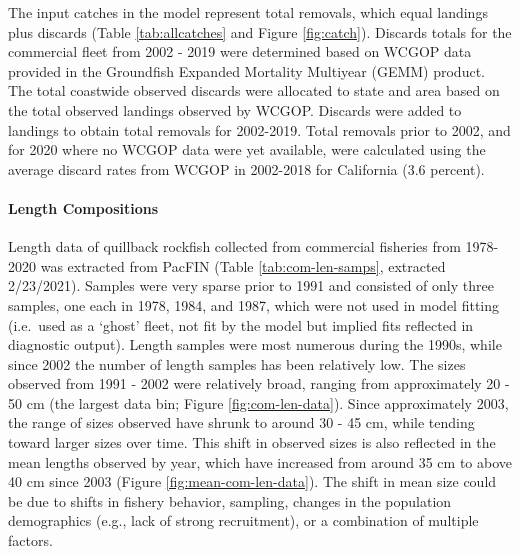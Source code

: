 \documentclass[11pt,
  english,
  a4paper,
]{article}
\begin{document}
\leavevmode\tagmcend\tagstructend\par


The input catches in the model represent total removals, which equal landings plus discards (Table \ref{tab:allcatches} and Figure \ref{fig:catch}). Discards totals for the commercial fleet from 2002 - 2019 were determined based on WCGOP data provided in the Groundfish Expanded Mortality Multiyear (GEMM) product. The total coastwide observed discards were allocated to state and area based on the total observed landings observed by WCGOP. Discards were added to landings to obtain total removals for 2002-2019. Total removals prior to 2002, and for 2020 where no WCGOP data were yet available, were calculated using the average discard rates from WCGOP in 2002-2018 for California (3.6 percent).

\leavevmode\tagmcend\tagstructend\par


\hypertarget{length-compositions}{%
\paragraph{Length Compositions}\label{length-compositions}}

\leavevmode\tagmcend\tagstructend


Length data of quillback rockfish collected from commercial fisheries from 1978-2020 was extracted from PacFIN (Table \ref{tab:com-len-samps}, extracted 2/23/2021). Samples were very sparse prior to 1991 and consisted of only three samples, one each in 1978, 1984, and 1987, which were not used in model fitting (i.e.~used as a `ghost' fleet, not fit by the model but implied fits reflected in diagnostic output). Length samples were most numerous during the 1990s, while since 2002 the number of length samples has been relatively low. The sizes observed from 1991 - 2002 were relatively broad, ranging from approximately 20 - 50 cm (the largest data bin; Figure \ref{fig:com-len-data}). Since approximately 2003, the range of sizes observed have shrunk to around 30 - 45 cm, while tending toward larger sizes over time. This shift in observed sizes is also reflected in the mean lengths observed by year, which have increased from around 35 cm to above 40 cm since 2003 (Figure \ref{fig:mean-com-len-data}). The shift in mean size could be due to shifts in fishery behavior, sampling, changes in the population demographics (e.g., lack of strong recruitment), or a combination of multiple factors.
\end{document}
